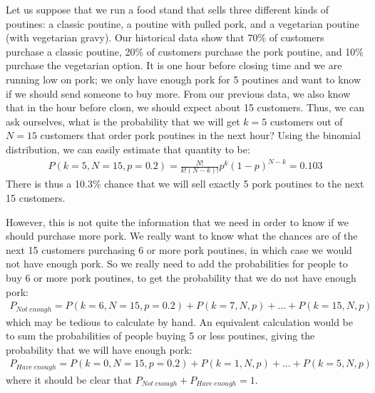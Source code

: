 Let us suppose that we run a food stand that sells three different kinds of poutines: a classic poutine, a poutine with pulled pork, and a vegetarian poutine (with vegetarian gravy). Our historical data show that 70\% of customers purchase a classic poutine, 20\% of customers purchase the pork poutine, and 10\% purchase the vegetarian option. It is one hour before closing time and we are running low on pork; we only have enough pork for 5 poutines and want to know if we should send someone to buy more. From our previous data, we also know that in the hour before closn, we should expect about 15 customers. Thus, we can ask ourselves, what is the probability that we will get $k=5$ customers out of $N=15$ customers that order pork poutines in the next hour? Using the binomial distribution, we can easily estimate that quantity to be:
\begin{align*}
P(k=5,N=15,p=0.2)=\frac{N!}{k!(N-k)!}p^k(1-p)^{N-k}=0.103
\end{align*}
There is thus a 10.3\% chance that we will sell exactly 5 pork poutines to the next 15 customers.


However, this is not quite the  information that we need in order to know if we should purchase more pork. We really want to know what the chances are of the next 15 customers purchasing 6 or more pork poutines, in which case we would not have enough pork. So we really need to add the probabilities for people to buy 6 or more pork poutines, to get the probability that we do not have enough pork:
\begin{align*}
P_{Not\: enough}=P(k=6,N=15,p=0.2)+P(k=7,N,p)+\dots+P(k=15,N,p)
\end{align*}
which may be tedious to calculate by hand. An equivalent calculation would be to sum the probabilities of people buying 5 or less poutines, giving the probability that we will have enough pork:
\begin{align*}
P_{Have\: enough}=P(k=0,N=15,p=0.2)+P(k=1,N,p)+\dots+P(k=5,N,p)
\end{align*}
where it should be clear that $P_{Not\: enough}+P_{Have\: enough}=1$.

